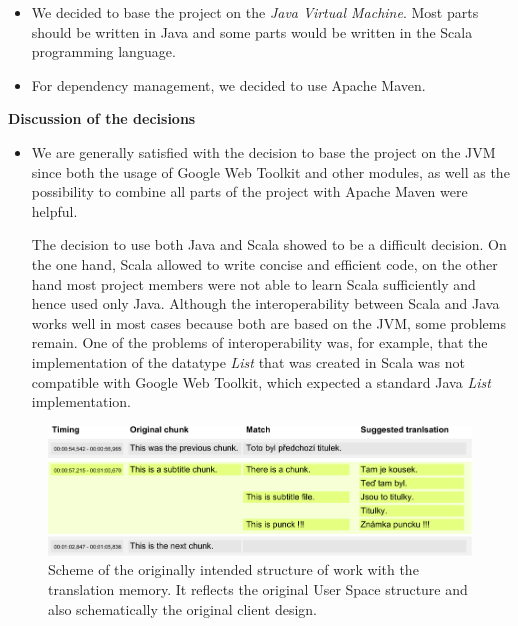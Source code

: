 \begin{itemize}
	\item We decided to base the project on the \emph{Java Virtual Machine}. Most parts should be written in Java and some parts would be written in the Scala programming language.
	\item For dependency management, we decided to use Apache Maven.
\end{itemize}

\noindent\textbf{Discussion of the decisions}

\begin{itemize}
	\item We are generally satisfied with the decision to base the project on the JVM since both the usage of Google Web Toolkit and other modules, as well as the possibility to combine all parts of the project with Apache Maven were helpful. 
	
	The decision to use both Java and Scala showed to be a difficult decision. On the one hand, Scala allowed to write concise and efficient code, on the other hand most project members were not able to learn Scala sufficiently and hence used only Java. Although the interoperability between Scala and Java works well in most cases because both are based on the JVM, some problems remain. One of the problems of interoperability was, for example, that the implementation of the datatype \emph{List} that was created in Scala was not compatible with Google Web Toolkit, which expected a standard Java \emph{List} implementation.
\end{itemize}

\begin{figure}[h]
\begin{center}
\includegraphics{./figures/original_strucutre.pdf}
\end{center}

\caption{Scheme of the originally intended structure of work with the translation memory. It reflects the original User Space structure and also schematically the original client design.}

\end{figure}


